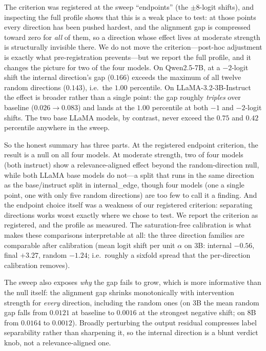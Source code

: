 \documentclass[11pt]{article}
\begin{document}
The criterion was registered at the sweep ``endpoints'' (the $\pm8$-logit
shifts), and inspecting the full profile shows that this is a weak place to
test: at those points every direction has been pushed hardest, and the
alignment gap is compressed toward zero for \emph{all} of them, so a direction
whose effect lives at moderate strength is structurally invisible there. We do
not move the criterion---post-hoc adjustment is exactly what pre-registration
prevents---but we report the full profile, and it changes the picture for two
of the four models. On Qwen2.5-7B, at a $-2$-logit shift the internal
direction's gap ($0.166$) exceeds the maximum of all twelve random directions
($0.143$), i.e.\ the $1.00$ percentile. On LLaMA-3.2-3B-Instruct the effect is
broader rather than a single point: the gap roughly \emph{triples} over baseline
($0.026 \to 0.083$) and lands at the $1.00$ percentile at both $-1$ and
$-2$-logit shifts. The two base LLaMA models, by contrast, never exceed the
$0.75$ and $0.42$ percentile anywhere in the sweep.

So the honest summary has three parts. At the registered endpoint criterion,
the result is a null on all four models. At moderate strength, two of four
models (both instruct) show a relevance-aligned effect beyond the
random-direction null, while both LLaMA base models do not---a split that runs
in the same direction as the base/instruct split in internal\_edge, though four
models (one a single point, one with only five random directions) are too few
to call it a finding. And the endpoint choice itself was a weakness of our
registered criterion: separating directions works worst exactly where we chose
to test. We report the criterion as registered, and the profile as measured.
The saturation-free calibration is what makes these comparisons interpretable
at all: the three direction families are comparable after calibration (mean
logit shift per unit $\alpha$ on 3B: internal $-0.56$, final $+3.27$, random
$-1.24$; i.e.\ roughly a sixfold spread that the per-direction calibration
removes).

The sweep also exposes \emph{why} the gap fails to grow, which is more
informative than the null itself: the alignment gap shrinks monotonically with
intervention strength for \emph{every} direction, including the random ones
(on 3B the mean random gap falls from $0.0121$ at baseline to $0.0016$ at the
strongest negative shift; on 8B from $0.0164$ to $0.0012$). Broadly perturbing
the output residual compresses label separability rather than sharpening it, so
the internal direction is a blunt verdict knob, not a relevance-aligned one.
\end{document}
